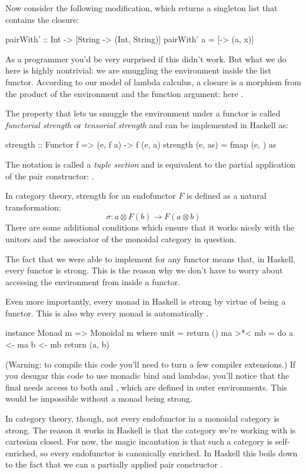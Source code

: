 \documentclass[DaoFP]{subfiles}
\begin{document}
Now consider the following modification, which returns a singleton list that contains the closure:
\begin{haskell}
pairWith' :: Int -> [String -> (Int, String)]
pairWith' a = [\x -> (a, x)]
\end{haskell}
As a programmer you'd be very surprised if this didn't work. But what we do here is highly nontrivial: we are smuggling the environment inside the list functor. According to our model of lambda calculus, a closure is a morphism from the product of the environment and the function argument: here . 

The property that lets us smuggle the environment under a functor is called \emph{functorial strength} or \emph{tensorial strength} and can be implemented in Haskell as:
\begin{haskell}
strength :: Functor f => (e, f a) -> f (e, a)
strength (e, as) = fmap (e, ) as
\end{haskell}
The notation  is called a \emph{tuple section} and is equivalent to the partial application of the pair constructor: .

In category theory, strength for an endofunctor $F$ is defined as a natural transformation:
\[ \sigma \colon a \otimes F(b) \to F (a \otimes b) \]
There are some additional conditions which ensure that it works nicely with the unitors and the associator of the monoidal category in question.

The fact that we were able to implement  for any functor means that, in Haskell, every functor is strong. This is the reason why we don't have to worry about accessing the environment from inside a functor. 

Even more importantly, every monad in Haskell is strong by virtue of being a functor. This is also why every monad is automatically . 
\begin{haskell}
instance Monad m => Monoidal m where
  unit = return ()
  ma >*< mb = do
    a <- ma
    b <- mb
    return (a, b)
\end{haskell}
(Warning: to compile this code you'll need to turn a few compiler extensions.) If you desugar this code to use monadic bind and lambdas, you'll notice that the final  needs access to both  and , which are defined in outer environments. This would be impossible without a monad being strong.

In category theory, though, not every endofunctor in a monoidal category is strong. The reason it works in Haskell is that the category we're working with is cartesian closed. For now, the magic incantation is that such a category is self-enriched, so every endofunctor is canonically enriched. In Haskell this boils down to the fact that we can  a partially applied pair constructor .
\end{document}
